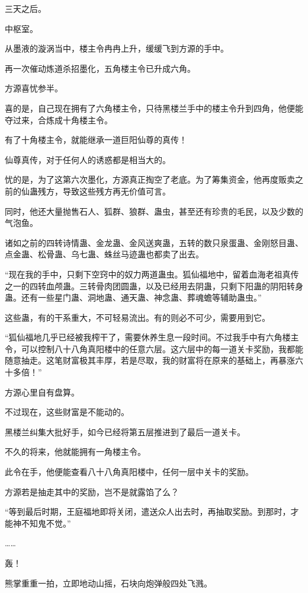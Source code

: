 \begin{this_body}
三天之后。

中枢室。

从墨液的漩涡当中，楼主令冉冉上升，缓缓飞到方源的手中。

再一次催动炼道杀招墨化，五角楼主令已升成六角。

方源喜忧参半。

喜的是，自己现在拥有了六角楼主令，只待黑楼兰手中的楼主令升到四角，他便能夺过来，合炼成十角楼主令。

有了十角楼主令，就能继承一道巨阳仙尊的真传！

仙尊真传，对于任何人的诱惑都是相当大的。

忧的是，为了这第六次墨化，方源真正掏空了老底。为了筹集资金，他再度贩卖之前的仙蛊残方，导致这些残方再无价值可言。

同时，他还大量抛售石人、狐群、狼群、蛊虫，甚至还有珍贵的毛民，以及少数的气泡鱼。

诸如之前的四转诗情蛊、金龙蛊、金风送爽蛊，五转的数只泉蛋蛊、金刚怒目蛊、点金蛊、松骨蛊、乌七蛊、蛛丝马迹蛊也都卖了出去。

“现在我的手中，只剩下空窍中的奴力两道蛊虫。狐仙福地中，留着血海老祖真传之一的四转血颅蛊。三转骨肉团圆蛊，以及已经用去阴蛊，只剩下阳蛊的阴阳转身蛊。还有一些星门蛊、洞地蛊、通天蛊、神念蛊、葬魂蟾等辅助蛊虫。”

这些蛊，有的干系重大，不可轻易流出。有的则必不可少，需要用到它。

“狐仙福地几乎已经被我榨干了，需要休养生息一段时间。不过我手中有六角楼主令，可以控制八十八角真阳楼中的任意六层。这六层中的每一道关卡奖励，我都能随意抽走。这笔财富极其丰厚，若是尽取，我的财富将在原来的基础上，再暴涨六十多倍！”

方源心里自有盘算。

不过现在，这些财富是不能动的。

黑楼兰纠集大批好手，如今已经将第五层推进到了最后一道关卡。

不久的将来，他就能拥有一角楼主令。

此令在手，他便能查看八十八角真阳楼中，任何一层中关卡的奖励。

方源若是抽走其中的奖励，岂不是就露馅了么？

“等到最后时期，王庭福地即将关闭，遣送众人出去时，再抽取奖励。到那时，才能神不知鬼不觉。”

……

轰！

熊掌重重一拍，立即地动山摇，石块向炮弹般四处飞溅。


\end{this_body}
